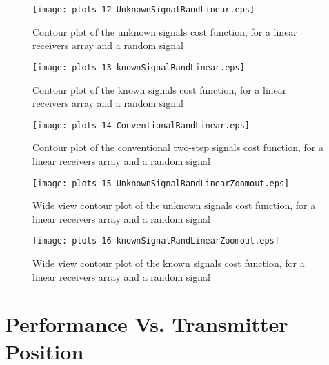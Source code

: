 \begin{figure}
\begin{center}
\texttt{[image: plots-12-UnknownSignalRandLinear.eps]} 
\end{center}
\caption{Contour plot of the unknown signals cost function, for a linear receivers array and a random signal}
\label{fig:unknownSignalsRandLinear}
\end{figure}

\begin{figure}
\begin{center}
\texttt{[image: plots-13-knownSignalRandLinear.eps]} 
\end{center}
\caption{Contour plot of the known signals cost function, for a linear receivers array and a random signal}
\label{fig:knownSignalsRandLinear}
\end{figure}

\begin{figure}
\begin{center}
\texttt{[image: plots-14-ConventionalRandLinear.eps]} 
\end{center}
\caption{Contour plot of the conventional two-step signals cost function, for a linear receivers array and a random signal}
\label{fig:conventionalRandLinear}
\end{figure}

\begin{figure}
\begin{center}
\texttt{[image: plots-15-UnknownSignalRandLinearZoomout.eps]} 
\end{center}
\caption{Wide view contour plot of the unknown signals cost function, for a linear receivers array and a random signal}
\label{fig:unknownSignalRandLinearZoomout}
\end{figure}

\begin{figure}
\begin{center}
\texttt{[image: plots-16-knownSignalRandLinearZoomout.eps]} 
\end{center}
\caption{Wide view contour plot of the known signals cost function, for a linear receivers array and a random signal}
\label{fig:knownSignalRandLinearZoomout}
\end{figure}


\section{Performance Vs. Transmitter Position}

